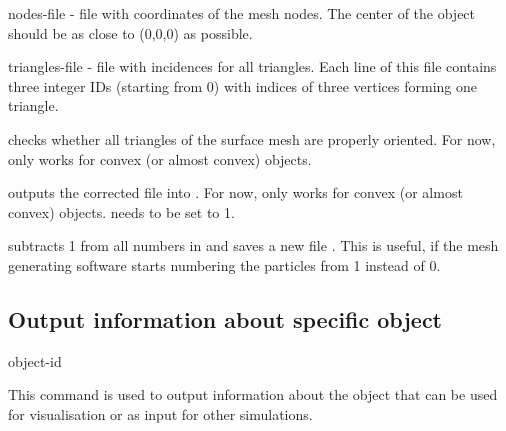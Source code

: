 \begin{arguments}
\item[nodes-file \var{nodes.dat}] - file with coordinates of the mesh nodes. The center of the object should be as close to (0,0,0) as possible.
\item[triangles-file \var{triangles.dat}] - file with incidences for all triangles. Each line of this file contains three integer IDs (starting from 0) with indices of three vertices forming one triangle.
\item[\opt{orientation}] checks whether all triangles of the surface mesh are properly oriented. For now, only works for convex (or almost convex) objects.
\item[\opt{repair \var{output\_file.dat} \var{method}}] outputs the corrected  file into . For now, only works for convex (or almost convex) objects.  needs to be set to 1.
\item[\opt{shift-node-ids \var{output\_file.dat}}] subtracts 1 from all numbers in  and saves a new file . This is useful, if the mesh generating software starts numbering the particles from 1 instead of 0.
\end{arguments}
	 
\subsection{\label{ssec:oif-object-output}Output information about specific object}

\begin{essyntax}
  object-id  
  \begin{features}
  \end{features}
\end{essyntax}

This command is used to output information about the object that can be used for visualisation or as input for other simulations.

